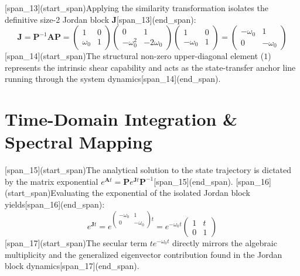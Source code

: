 \documentclass[12pt,letterpaper]{article}
\theoremstyle{definition}
\begin{document}
[span_13](start_span)Applying the similarity transformation isolates the definitive size-2 Jordan block $\mathbf{J}$[span_13](end_span):
\begin{equation}
    \mathbf{J} = \mathbf{P}^{-1}\mathbf{A}\mathbf{P} = \begin{pmatrix} 1 & 0 \\ \omega_{0} & 1 \end{pmatrix} \begin{pmatrix} 0 & 1 \\ -\omega_{0}^{2} & -2\omega_{0} \end{pmatrix} \begin{pmatrix} 1 & 0 \\ -\omega_{0} & 1 \end{pmatrix} = \begin{pmatrix} -\omega_{0} & 1 \\ 0 & -\omega_{0} \end{pmatrix}
\end{equation}
[span_14](start_span)The structural non-zero upper-diagonal element ($1$) represents the intrinsic shear capability and acts as the state-transfer anchor line running through the system dynamics[span_14](end_span).

\section{Time-Domain Integration \& Spectral Mapping}
[span_15](start_span)The analytical solution to the state trajectory is dictated by the matrix exponential $e^{\mathbf{A}t} = \mathbf{P}e^{\mathbf{J}t}\mathbf{P}^{-1}$[span_15](end_span). [span_16](start_span)Evaluating the exponential of the isolated Jordan block yields[span_16](end_span):
\begin{equation}
    e^{\mathbf{J}t} = e^{\begin{pmatrix} -\omega_{0} & 1 \\ 0 & -\omega_{0} \end{pmatrix}t} = e^{-\omega_{0}t} \begin{pmatrix} 1 & t \\ 0 & 1 \end{pmatrix}
\end{equation}
[span_17](start_span)The secular term $t e^{-\omega_{0}t}$ directly mirrors the algebraic multiplicity and the generalized eigenvector contribution found in the Jordan block dynamics[span_17](end_span).
\end{document}
